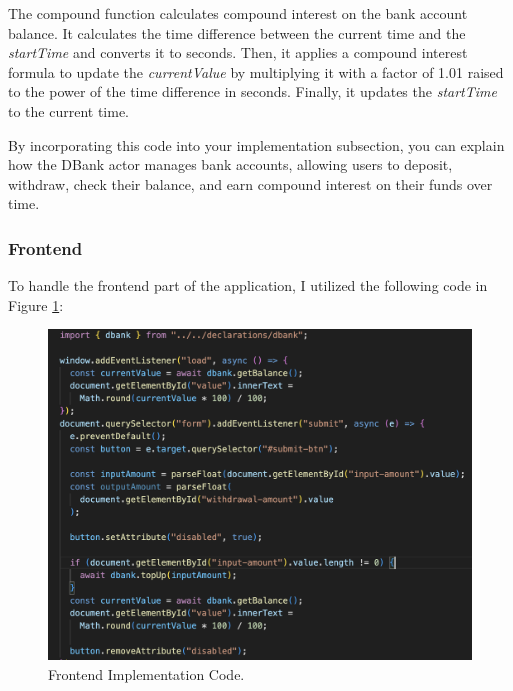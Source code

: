 The compound function calculates compound interest on the bank account balance. It calculates the time difference between the current time and the \textit{startTime} and converts it to seconds. Then, it applies a compound interest formula to update the \textit{currentValue} by multiplying it with a factor of 1.01 raised to the power of the time difference in seconds. Finally, it updates the \textit{startTime} to the current time.

By incorporating this code into your implementation subsection, you can explain how the DBank actor manages bank accounts, allowing users to deposit, withdraw, check their balance, and earn compound interest on their funds over time.

\subsubsection{Frontend}

To handle the frontend part of the application, I utilized the following code in Figure \ref{fig:Frontend Implementation Code}:


\begin{figure}[h]
    \centering
    \includegraphics[height=1\textwidth, width=1\textwidth]{frontend.png}
    \caption{Frontend Implementation Code.}
    \label{fig:Frontend Implementation Code}
\end{figure}

